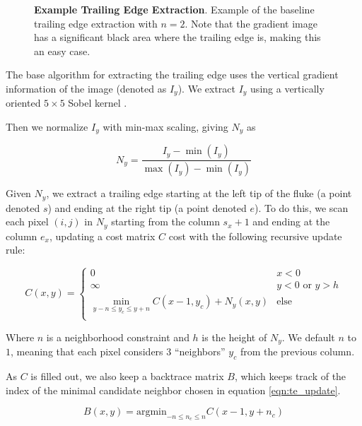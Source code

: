 \begin{figure}[t]%
\centering
{}
\newline
{}
\caption{\textbf{Example Trailing Edge Extraction}. Example of the baseline trailing edge extraction with $n = 2$. Note that the gradient image has a significant black area where the trailing edge is, making this an easy case.}
\label{fig:example_te_extract_noscorer}
\end{figure}

The base algorithm for extracting the trailing edge uses the vertical gradient information of the image (denoted as $I_y$).
We extract $I_y$ using a vertically oriented $5 \times 5$ Sobel kernel \cite{Sobel1968}.  

Then we normalize $I_y$ with min-max scaling, giving $N_y$ as

\begin{equation} \label{eqn:norm01}
N_{y} = \frac{I_y - \min(I_y)}{\max(I_y) - \min(I_y)}
\end{equation}

Given $N_y$, we extract a trailing edge starting at the left tip of the fluke (a point denoted $s$) and ending at the right tip (a point denoted $e$).
To do this, we scan each pixel $(i,j)$ in $N_y$ starting from the column $s_x + 1$ and ending at the column $e_x$, updating a cost matrix $C$ cost with the following recursive update rule:

\begin{equation} \label{eqn:te_update}
C(x,y) = 
\begin{cases}
	0 & x < 0 \\
	\infty & y < 0 \text{ or } y > h \\
	\min_{y - n \leq y_c \leq y + n}C(x-1, y_c) + N_y(x,y) & \text{else} \\
\end{cases}
\end{equation}

Where $n$ is a neighborhood constraint and $h$ is the height of $N_y$.  
We default $n$ to $1$, meaning that each pixel considers $3$ ``neighbors'' $y_c$ from the previous column.

As $C$ is filled out, we also keep a backtrace matrix $B$, which keeps track of the index of the minimal candidate neighbor chosen in equation \eqref{eqn:te_update}.

\begin{equation} \label{eqn:backtrace_update}
	B(x,y) = \text{argmin}_{-n \leq n_c \leq n} C(x-1, y+n_c)
\end{equation}

